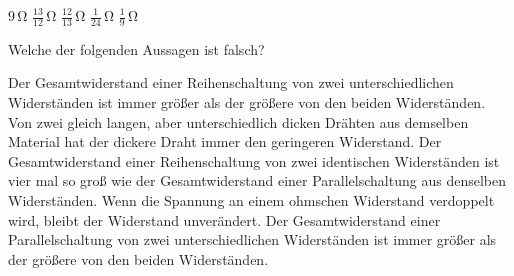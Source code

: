 \documentclass[11pt]{exam}
\begin{document}
\begin{questions}
\begin{choices}
	\choice \(\mathrm{9\,\Omega}\)
	\choice \(\mathrm{\frac{13}{12}\,\Omega}\)
	\choice \(\mathrm{\frac{12}{13}\,\Omega}\)
	\choice \(\mathrm{\frac{1}{24}\,\Omega}\)
	\choice \(\mathrm{\frac{1}{9}\,\Omega}\)
\end{choices}

\vspace{3mm}\question Welche der folgenden Aussagen ist falsch?

\begin{choices}
	\choice Der Gesamtwiderstand einer Reihenschaltung von zwei unterschiedlichen Widerständen ist immer größer als der größere von den beiden Widerständen.
	\choice Von zwei gleich langen, aber unterschiedlich dicken Drähten aus demselben Material hat der dickere Draht immer den geringeren Widerstand.
	\choice Der Gesamtwiderstand einer Reihenschaltung von zwei identischen Widerständen ist vier mal so groß wie der Gesamtwiderstand einer Parallelschaltung aus denselben Widerständen.
	\choice Wenn die Spannung an einem ohmschen Widerstand verdoppelt wird, bleibt der Widerstand unverändert.
	\choice Der Gesamtwiderstand einer Parallelschaltung von zwei unterschiedlichen Widerständen ist immer größer als der größere von den beiden Widerständen.
\end{choices}

\vspace{3mm}\end{questions}
\end{document}

